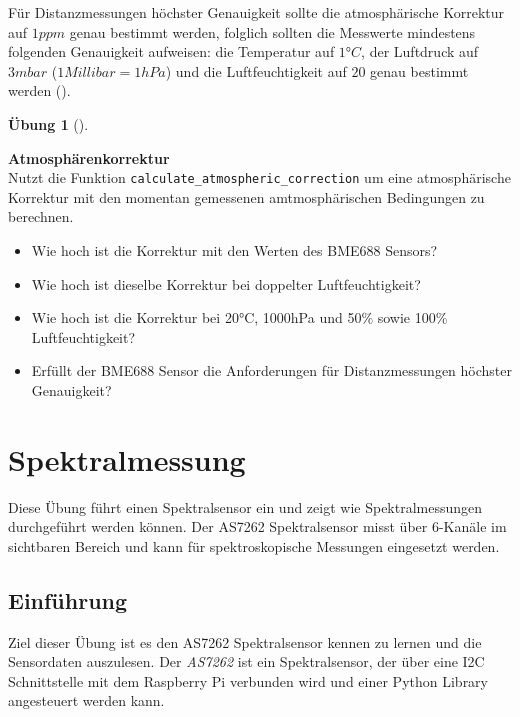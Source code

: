 \documentclass[
  11pt,
  a4paperpaper,
  oneside, openany  ,captions=tableheading
]{scrbook}
\providecommand{\tightlist}{%
  \setlength{\itemsep}{0pt}\setlength{\parskip}{0pt}}
\theoremstyle{definition}
\newtheorem{exercise}{Übung}[chapter]
\theoremstyle{remark}
\begin{document}
Für Distanzmessungen höchster Genauigkeit sollte die atmosphärische
Korrektur auf \(1 ppm\) genau bestimmt werden, folglich sollten die
Messwerte mindestens folgenden Genauigkeit aufweisen: die Temperatur auf
\(1°C\), der Luftdruck auf \(3 mbar\) (\(1 Millibar= 1 hPa\)) und die
Luftfeuchtigkeit auf \(20 %
\) genau bestimmt werden ().

\begin{exercise}[]\protect\hypertarget{exr-atmosphaerenkorrektur}{}\label{exr-atmosphaerenkorrektur}

\textbf{Atmosphärenkorrektur}\\
Nutzt die Funktion \texttt{calculate\_atmospheric\_correction} um eine
atmosphärische Korrektur mit den momentan gemessenen amtmosphärischen
Bedingungen zu berechnen.

\begin{itemize}
\tightlist
\item
  Wie hoch ist die Korrektur mit den Werten des BME688 Sensors?
\item
  Wie hoch ist dieselbe Korrektur bei doppelter Luftfeuchtigkeit?
\item
  Wie hoch ist die Korrektur bei 20°C, 1000hPa und 50\% sowie 100\%
  Luftfeuchtigkeit?
\item
  Erfüllt der BME688 Sensor die Anforderungen für Distanzmessungen
  höchster Genauigkeit?
\end{itemize}

\end{exercise}

\chapter{Spektralmessung}\label{spektralmessung}

Diese Übung führt einen Spektralsensor ein und zeigt wie
Spektralmessungen durchgeführt werden können. Der AS7262 Spektralsensor
misst über 6-Kanäle im sichtbaren Bereich und kann für spektroskopische
Messungen eingesetzt werden.

\hfill\break

\section{Einführung}\label{einfuxfchrung-1}

Ziel dieser Übung ist es den AS7262 Spektralsensor kennen zu lernen und
die Sensordaten auszulesen. Der \emph{AS7262} ist ein Spektralsensor,
der über eine I2C Schnittstelle mit dem Raspberry Pi verbunden wird und
einer Python Library angesteuert werden kann.
\end{document}

